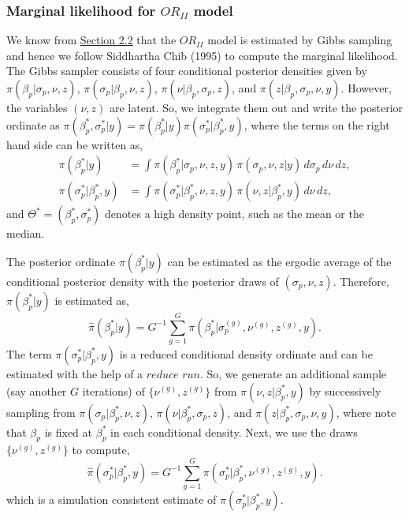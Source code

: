 \hypertarget{marginal-likelihood-for-or_ii-model}{%
\subsubsection{\texorpdfstring{Marginal likelihood for \(OR_{II}\) model}{Marginal likelihood for OR\_\{II\} model}}\label{marginal-likelihood-for-or_ii-model}}

We know from \protect\hyperlink{sec:ORII}{Section 2.2} that the \(OR_{II}\) model is estimated by Gibbs sampling and hence we follow Siddhartha Chib (1995) to compute the marginal likelihood. The Gibbs sampler consists of four conditional posterior densities given by \(\pi(\beta_{p}|\sigma_{p},\nu,z)\), \(\pi(\sigma_{p}|\beta_{p},\nu,z)\), \(\pi(\nu|\beta_{p}, \sigma_{p},z)\), and \(\pi(z|\beta_{p},\sigma_{p},\nu,y)\). However, the variables \((\nu, z)\) are latent. So, we integrate them out and write the posterior ordinate as \(\pi(\beta_{p}^{\ast},\sigma_{p}^{\ast}|y) = \pi(\beta_{p}^{\ast}|y) \pi(\sigma_{p}^{\ast}|\beta_{p}^{\ast},y)\), where the terms on the right hand side can be written as,
\begin{equation*} 
\begin{split} 
\pi(\beta_{p}^{\ast}|y) & = \int \pi(\beta_{p}^{\ast}|\sigma_{p},\nu,z,y) \, \pi(\sigma_{p},\nu,z|y) \, d\sigma_{p} \, d\nu \, dz, \\ \pi(\sigma_{p}^{\ast}|\beta_{p}^{\ast},y) & = \int \pi(\sigma_{p}^{\ast}|\beta_{p}^{\ast},\nu,z,y) \,\pi(\nu,z|\beta_{p}^{\ast},y) \, d\nu \, dz, \end{split}
\end{equation*}
and \(\Theta^{\ast} = (\beta_{p}^{\ast}, \sigma_{p}^{\ast})\) denotes a high density point, such as the mean or the median.

The posterior ordinate \(\pi(\beta_{p}^{\ast}|y)\) can be estimated as the ergodic average of the conditional posterior density with the posterior draws of \((\sigma_{p},\nu,z)\). Therefore, \(\pi(\beta_{p}^{\ast}|y)\) is estimated as,
\begin{equation} 
\hat{\pi}(\beta_{p}^{\ast}|y) = G^{-1} \sum_{g=1}^{G} \pi(\beta_{p}^{\ast}|\sigma_{p}^{(g)}, \nu^{(g)}, z^{(g)},y ).
\label{eq:ORIIbetaPostOrd} 
\end{equation}
The term \(\pi(\sigma_{p}^{\ast}|\beta_{p}^{\ast},y)\) is a reduced conditional density ordinate and can be estimated with the help of a \(\textit{reduce run}\). So, we generate an additional sample (say another \(G\) iterations) of \(\{ \nu^{(g)},z^{(g)} \}\) from \(\pi(\nu,z|\beta_{p}^{\ast},y)\) by successively sampling from \(\pi(\sigma_{p}|\beta_{p}^{\ast},\nu,z)\), \(\pi(\nu|\beta_{p}^{\ast}, \sigma_{p},z)\), and \(\pi(z|\beta_{p}^{\ast},\sigma_{p},\nu,y)\), where note that \(\beta_{p}\) is fixed at \(\beta_{p}^{\ast}\) in each conditional density. Next, we use the draws \(\{ \nu^{(g)},z^{(g)} \}\) to compute,
\begin{equation} 
\hat{\pi}(\sigma_{p}^{\ast}|\beta_{p}^{\ast},y) = G^{-1} \sum_{g=1}^{G} \pi(\sigma_{p}^{\ast}|\beta_{p}^{\ast},\nu^{(g)}, z^{(g)},y).
\label{eq:ORIIsigmaPostOrd}
\end{equation}
which is a simulation consistent estimate of \(\pi(\sigma_{p}^{\ast}|\beta_{p}^{\ast},y)\).


